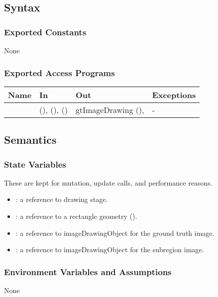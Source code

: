 \documentclass[12pt, titlepage]{article}
\begin{document}
\subsection{Syntax}

\subsubsection{Exported Constants}
None
\subsubsection{Exported Access Programs}

\begin{center}
\begin{tabular}{L{5cm} L{4cm} L{4cm} L{2cm}}
\hline
\textbf{Name} & \textbf{In} & \textbf{Out} & \textbf{Exceptions} \\
\hline
{} &  (),
   (),  ()
  & gtImageDrawing (),  & - \\
\hline
\end{tabular}
\end{center}

\subsection{Semantics}

\subsubsection{State Variables}
These are kept for mutation, update calls, and performance reasons.
\begin{itemize}
  \item {}: a reference to drawing stage.
  \item {}: a reference to a rectangle geometry ().
  \item {}: a reference to imageDrawingObject for the ground truth image.
  \item {}: a reference to imageDrawingObject for the subregion image.
\end{itemize}

\subsubsection{Environment Variables and Assumptions}
None
\end{document}
